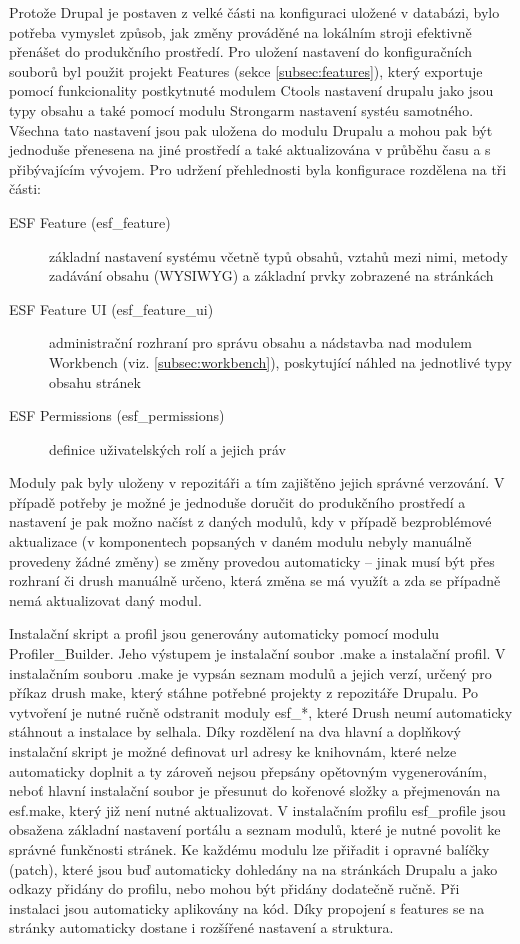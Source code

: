 Protože Drupal je postaven z velké části na konfiguraci uložené v databázi, bylo potřeba vymyslet způsob, jak změny prováděné na lokálním stroji efektivně přenášet do produkčního prostředí. Pro uložení nastavení do konfiguračních souborů byl použit projekt Features (sekce \ref{subsec:features}), který exportuje pomocí funkcionality postkytnuté modulem Ctools nastavení drupalu jako jsou typy obsahu a také pomocí modulu Strongarm nastavení systéu samotného. Všechna tato nastavení jsou pak uložena do modulu Drupalu a mohou pak být jednoduše přenesena na jiné prostředí a také aktualizována v průběhu času a s přibývajícím vývojem. Pro udržení přehlednosti byla konfigurace rozdělena na tři části:
\begin{description}
  \item[ESF Feature (esf\_feature)] základní nastavení systému včetně typů obsahů, vztahů mezi nimi, metody zadávání obsahu (WYSIWYG) a základní prvky zobrazené na stránkách

  \item[ESF Feature UI (esf\_feature\_ui)] administrační rozhraní pro správu obsahu a nádstavba nad modulem Workbench (viz. \ref{subsec:workbench}), poskytující náhled na jednotlivé typy obsahu stránek
  \item[ESF Permissions (esf\_permissions)] definice uživatelských rolí a jejich práv
\end{description}
Moduly pak byly uloženy v repozitáři a tím zajištěno jejich správné verzování. V případě potřeby je možné je jednoduše doručit do produkčního prostředí a nastavení je pak možno načíst z daných modulů, kdy v případě bezproblémové aktualizace (v komponentech popsaných v daném modulu nebyly manuálně provedeny žádné změny) se změny provedou automaticky – jinak musí být přes rozhraní či drush manuálně určeno, která změna se má využít a zda se případně nemá aktualizovat daný modul.

Instalační skript a profil jsou generovány automaticky pomocí modulu Profiler\_Builder. Jeho výstupem je instalační soubor .make a instalační profil. V instalačním souboru .make je vypsán seznam modulů a jejich verzí, určený pro příkaz drush make, který stáhne potřebné projekty z repozitáře Drupalu. Po vytvoření je nutné ručně odstranit moduly esf\_*, které Drush neumí automaticky stáhnout a instalace by selhala. Díky rozdělení na dva hlavní a doplňkový instalační skript je možné definovat url adresy ke knihovnám, které nelze automaticky doplnit a ty zároveň nejsou přepsány opětovným vygenerováním, neboť hlavní instalační soubor je přesunut do kořenové složky a přejmenován na esf.make, který již není nutné aktualizovat. V instalačním profilu esf\_profile jsou obsažena základní nastavení portálu a seznam modulů, které je nutné povolit ke správné funkčnosti stránek. Ke každému modulu lze přiřadit i opravné balíčky (patch), které jsou buď automaticky dohledány na na stránkách Drupalu a jako odkazy přidány do profilu, nebo mohou být přidány dodatečně ručně. Při instalaci jsou automaticky aplikovány na kód. Díky propojení s features se na stránky automaticky dostane i rozšířené nastavení a struktura.

